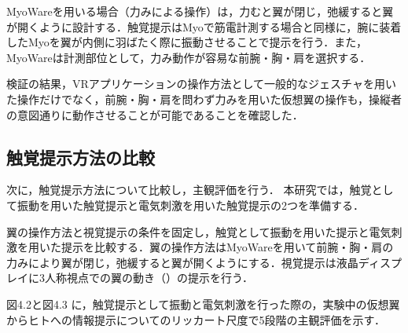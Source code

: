 \begin{small}
      MyoWareを用いる場合（力みによる操作）は，力むと翼が閉じ，弛緩すると翼が開くように設計する．触覚提示はMyoで筋電計測する場合と同様に，腕に装着したMyoを翼が内側に羽ばたく際に振動させることで提示を行う．また，MyoWareは計測部位として，力み動作が容易な前腕・胸・肩を選択する．

      検証の結果，VRアプリケーションの操作方法として一般的なジェスチャを用いた操作だけでなく，前腕・胸・肩を問わず力みを用いた仮想翼の操作も，操縦者の意図通りに動作させることが可能であることを確認した．

    \subsection{触覚提示方法の比較} %
      次に，触覚提示方法について比較し，主観評価を行う．
      本研究では，触覚として振動を用いた触覚提示と電気刺激を用いた触覚提示の2つを準備する．

      翼の操作方法と視覚提示の条件を固定し，触覚として振動を用いた提示と電気刺激を用いた提示を比較する．翼の操作方法はMyoWareを用いて前腕・胸・肩の力みにより翼が閉じ，弛緩すると翼が開くようにする．視覚提示は液晶ディスプレイに3人称視点での翼の動き（）の提示を行う．

      図4.2と図4.3
      に，触覚提示として振動と電気刺激を行った際の，実験中の仮想翼からヒトへの情報提示についてのリッカート尺度で5段階の主観評価を示す．

      
      \begin{table}[tb]
          \begin{center}
              \caption{Results of an experiment using vibration as a haptics presentation}
          \end{center}
      \end{table}
      

\end{small}
